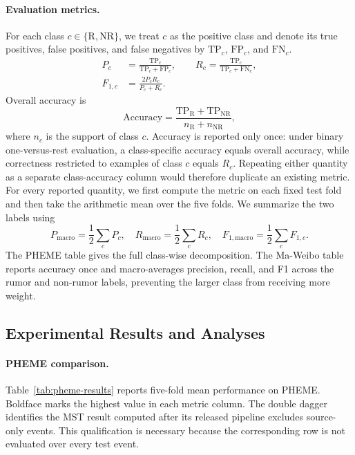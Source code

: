 \documentclass[sigconf,anonymous,review]{../acmart/acmart}
\begin{document}
\paragraph{Evaluation metrics.}
For each class $c\in\{\mathrm{R},\mathrm{NR}\}$, we treat $c$ as the positive
class and denote its true positives, false positives, and false negatives by
$\mathrm{TP}_c$, $\mathrm{FP}_c$, and $\mathrm{FN}_c$.
\begin{align}
  P_c&=\frac{\mathrm{TP}_c}
  {\mathrm{TP}_c+\mathrm{FP}_c},\qquad
  R_c=\frac{\mathrm{TP}_c}
  {\mathrm{TP}_c+\mathrm{FN}_c},\\
  F_{1,c}&=\frac{2P_cR_c}{P_c+R_c}.
\end{align}
Overall accuracy is
\begin{equation}
  \mathrm{Accuracy}
  =\frac{\mathrm{TP}_{\mathrm{R}}+\mathrm{TP}_{\mathrm{NR}}}
  {n_{\mathrm{R}}+n_{\mathrm{NR}}},
\end{equation}
where $n_c$ is the support of class $c$.  Accuracy is reported only once:
under binary one-versus-rest evaluation, a class-specific accuracy equals
overall accuracy, while correctness restricted to examples of class $c$
equals $R_c$.  Repeating either quantity as a separate class-accuracy column
would therefore duplicate an existing metric.  For every reported quantity,
we first compute the metric on each fixed test fold and then take the
arithmetic mean over the five folds.  We summarize the two labels using
\begin{equation}
  P_{\mathrm{macro}}=\frac{1}{2}\sum_c P_c,\quad
  R_{\mathrm{macro}}=\frac{1}{2}\sum_c R_c,\quad
  F_{1,\mathrm{macro}}=\frac{1}{2}\sum_c F_{1,c}.
\end{equation}
The PHEME table gives the full class-wise decomposition.  The Ma-Weibo table
reports accuracy once and macro-averages precision, recall, and F1 across the
rumor and non-rumor labels, preventing the larger class from receiving more
weight.

\subsection{Experimental Results and Analyses}
\label{sec:results}

\paragraph{PHEME comparison.}
Table~\ref{tab:pheme-results} reports five-fold mean performance on PHEME.
Boldface marks the highest value in each metric column.  The double dagger
identifies the MST result computed after its released pipeline excludes
source-only events.  This qualification is necessary because the corresponding
row is not evaluated over every test event.
\end{document}

